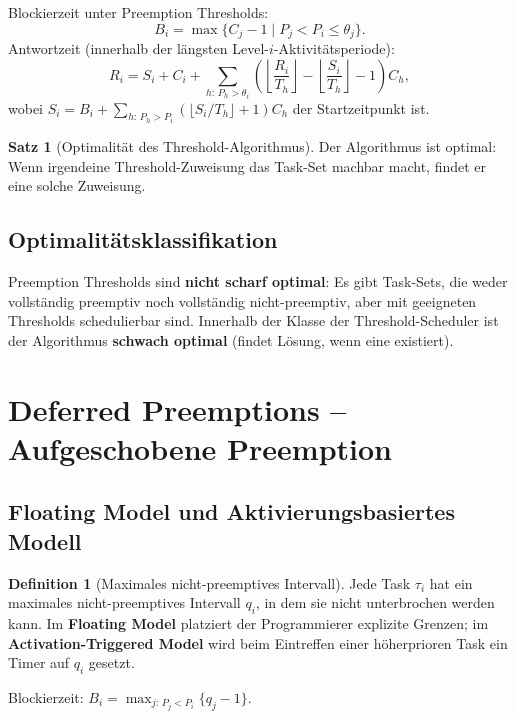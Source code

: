 ﻿\documentclass[a4paper,12pt]{report}
\theoremstyle{definition}
\newtheorem{definition}{Definition}[chapter]
\newtheorem{satz}{Satz}[chapter]
\begin{document}
Blockierzeit unter Preemption Thresholds:
\[
	B_i = \max\{C_j - 1 \mid P_j < P_i \leq \theta_j\}.
\]
Antwortzeit (innerhalb der längsten Level-$i$-Aktivitätsperiode):
\begin{equation}
	R_i = S_i + C_i + \sum_{h:\,P_h > \theta_i}\left(\left\lfloor \frac{R_i}{T_h} \right\rfloor - \left\lfloor \frac{S_i}{T_h} \right\rfloor - 1\right) C_h,
	\label{eq:rta_threshold}
\end{equation}
wobei $S_i = B_i + \sum_{h:\,P_h > P_i}\left(\lfloor S_i/T_h \rfloor + 1\right) C_h$ der Startzeitpunkt ist.

\begin{satz}[Optimalität des Threshold-Algorithmus]
	Der Algorithmus ist optimal: Wenn irgendeine Threshold-Zuweisung das Task-Set
	machbar macht, findet er eine solche Zuweisung.
\end{satz}

\subsection{Optimalitätsklassifikation}

Preemption Thresholds sind \textbf{nicht scharf optimal}: Es gibt Task-Sets, die
weder vollständig preemptiv noch vollständig nicht-preemptiv, aber mit geeigneten
Thresholds schedulierbar sind. Innerhalb der Klasse der Threshold-Scheduler ist der
Algorithmus \textbf{schwach optimal} (findet Lösung, wenn eine existiert).

\section{Deferred Preemptions -- Aufgeschobene Preemption}

\subsection{Floating Model und Aktivierungsbasiertes Modell}

\begin{definition}[Maximales nicht-preemptives Intervall]
	Jede Task $\tau_i$ hat ein maximales nicht-preemptives Intervall $q_i$, in dem
	sie nicht unterbrochen werden kann. Im \textbf{Floating Model} platziert der
	Programmierer explizite Grenzen; im \textbf{Activation-Triggered Model}
	wird beim Eintreffen einer höherprioren Task ein Timer auf $q_i$ gesetzt.
\end{definition}

Blockierzeit: $B_i = \max_{j:\,P_j < P_i}\{q_j - 1\}$.
\end{document}
